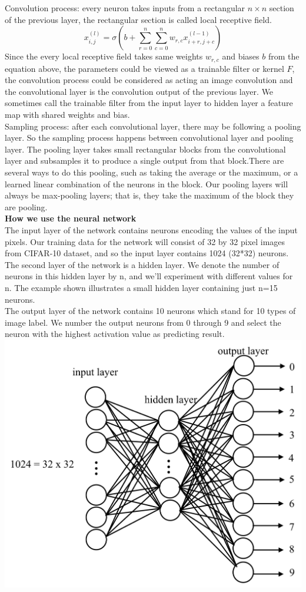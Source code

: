 \documentclass[11pt,letterpaper]{article}
\begin{document}
Convolution process: every neuron takes inputs from a rectangular $n\times n$ section of the previous layer, the rectangular section is called local receptive field.
$$x^{(l)}_{i,j}=\sigma(b+\sum^n_{r=0}\sum^n_{c=0}w_{r,c}x^{(l-1)}_{i+r,j+c})$$
Since the every local receptive field takes same weights $w_{r,c}$ and biases $b$ from the equation above, the parameters could be viewed as a trainable filter or kernel $F$, the convolution process could be considered as acting an image convolution and the convolutional layer is the convolution output of the previous layer. We sometimes call the trainable filter from the input layer to hidden layer a feature map with shared weights and bias.\\
Sampling process: after each convolutional layer, there may be following a pooling layer. So the sampling process happens between convolutional layer and pooling layer. The pooling layer takes small rectangular blocks from the convolutional layer and subsamples it to produce a single output from that block.There are several ways to do this pooling, such as taking the average or the maximum, or a learned linear combination of the neurons in the block. Our pooling layers will always be max-pooling layers; that is, they take the maximum of the block they are pooling.\\
{\bf How we use the neural network} \\
The input layer of the network contains neurons encoding the values of the input pixels. Our training data for the network will consist of 32 by 32 pixel images from CIFAR-10 dataset, and so the input layer contains 1024 (32*32) neurons.\\
 The second layer of the network is a hidden layer. We denote the number of neurons in this hidden layer by n, and we'll experiment with different values for n. The example shown illustrates a small hidden layer containing just n=15 neurons.\\
The output layer of the network contains 10 neurons which stand for 10 types of image label. We number the output neurons from 0 through 9 and select the neuron with the highest activation value as predicting result. \\
\includegraphics[scale=0.4]{neural_network.png}
\end{document}
